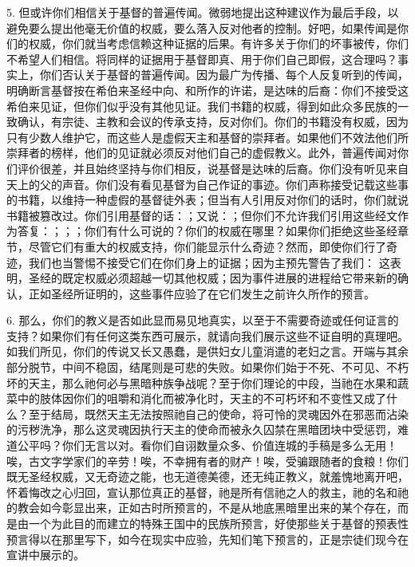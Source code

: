 5. 但或许你们相信关于基督的普遍传闻。微弱地提出这种建议作为最后手段，以避免要么提出他毫无价值的权威，要么落入反对他者的控制。好吧，如果传闻是你们的权威，你们就当考虑信赖这种证据的后果。有许多关于你们的坏事被传，你们不希望人们相信。将同样的证据用于基督即真、用于你们自己即假，这合理吗？事实上，你们否认关于基督的普遍传闻。因为最广为传播、每个人反复听到的传闻，明确断言基督按在希伯来圣经中向、和所作的许诺，是达味的后裔：你们不接受这希伯来见证，但你们似乎没有其他见证。我们书籍的权威，得到如此众多民族的一致确认，有宗徒、主教和会议的传承支持，反对你们。你们的书籍没有权威，因为只有少数人维护它，而这些人是虚假天主和基督的崇拜者。如果他们不效法他们所崇拜者的榜样，他们的见证就必须反对他们自己的虚假教义。此外，普遍传闻对你们评价很差，并且始终坚持与你们相反，说基督是达味的后裔。你们没有听见来自天上的父的声音。你们没有看见基督为自己作证的事迹。你们声称接受记载这些事的书籍，以维持一种虚假的基督徒外表；但当有人引用反对你们的话时，你们就说书籍被篡改过。你们引用基督的话：；又说：；但你们不允许我们引用这些经文作为答复：；；；你们有什么可说的？你们的权威在哪里？如果你们拒绝这些圣经章节，尽管它们有重大的权威支持，你们能显示什么奇迹？然而，即使你们行了奇迹，我们也当警惕不接受它们在你们身上的证据；因为主预先警告了我们：  这表明，圣经的既定权威必须超越一切其他权威；因为事件进展的进程给它带来新的确认，正如圣经所证明的，这些事件应验了在它们发生之前许久所作的预言。\par

6. 那么，你们的教义是否如此显而易见地真实，以至于不需要奇迹或任何证言的支持？如果你们有任何这类东西可展示，就请向我们展示这些不证自明的真理吧。如我们所见，你们的传说又长又愚蠢，是供妇女儿童消遣的老妇之言。开端与其余部分脱节，中间不稳固，结尾则是可悲的失败。如果你们始于不死、不可见、不朽坏的天主，那么祂何必与黑暗种族争战呢？至于你们理论的中段，当祂在水果和蔬菜中的肢体因你们的咀嚼和消化而被净化时，天主的不可朽坏和不变性又成了什么？至于结局，既然天主无法按照祂自己的使命，将可怜的灵魂因外在邪恶而沾染的污秽洗净，那么这灵魂因执行天主的使命而被永久囚禁在黑暗团块中受惩罚，难道公平吗？你们无言以对。看你们自诩数量众多、价值连城的手稿是多么无用！唉，古文字学家们的辛劳！唉，不幸拥有者的财产！唉，受骗跟随者的食粮！你们既无圣经权威，又无奇迹之能，也无道德美德，还无纯正教义，就羞愧地离开吧，怀着悔改之心归回，宣认那位真正的基督，祂是所有信祂之人的救主，祂的名和祂的教会如今彰显出来，正如古时所预言的，不是从地底黑暗里出来的某个存在，而是由一个为此目的而建立的特殊王国中的民族所预言，好使那些关于基督的预表性预言得以在那里写下，如今在现实中应验，先知们笔下预言的，正是宗徒们现今在宣讲中展示的。\par


